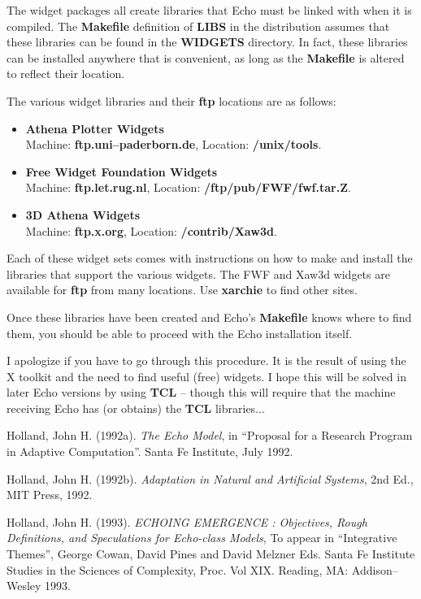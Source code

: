 The widget packages all create libraries that Echo must be linked with
when it is compiled. The {\bf Makefile} definition of {\bf LIBS} in
the distribution assumes that these libraries can be found in the {\bf
WIDGETS} directory. In fact, these libraries can be installed anywhere
that is convenient, as long as the {\bf Makefile} is altered to
reflect their location.

The various widget libraries and their {\bf ftp} locations are as
follows:

\begin{itemize}

\item {\bf Athena Plotter Widgets} \\
Machine: {\bf ftp.uni--paderborn.de}, Location: {\bf /unix/tools}.

\item {\bf Free Widget Foundation Widgets} \\
Machine: {\bf ftp.let.rug.nl}, Location: {\bf /ftp/pub/FWF/fwf.tar.Z}.

\item {\bf 3D Athena Widgets} \\
Machine: {\bf ftp.x.org}, Location: {\bf /contrib/Xaw3d}.

\end{itemize}

Each of these widget sets comes with instructions on how to make and
install the libraries that support the various widgets. The FWF and
Xaw3d widgets are available for {\bf ftp} from many locations. Use
{\bf xarchie} to find other sites.

Once these libraries have been created and Echo's {\bf Makefile} knows
where to find them, you should be able to proceed with the Echo
installation itself.

I apologize if you have to go through this procedure. It is the result
of using the X toolkit and the need to find useful (free) widgets. I
hope this will be solved in later Echo versions by using {\bf TCL} --
though this will require that the machine receiving Echo has (or
obtains) the {\bf TCL} libraries...

\newpage
\begin{thebibliography}{99}

Holland, John H. (1992a).
{\em The Echo Model},
in ``Proposal for a Research Program in Adaptive Computation''.
Santa Fe Institute, July 1992.

Holland, John H. (1992b).
{\em Adaptation in Natural and Artificial Systems}, 2nd Ed.,
MIT Press, 1992.

Holland, John H. (1993).
{\em ECHOING EMERGENCE : Objectives, Rough Definitions, and
Speculations for Echo-class Models},
To appear in ``Integrative Themes'', George Cowan, David Pines and
David Melzner Eds. Santa Fe Institute Studies in the Sciences of
Complexity, Proc. Vol XIX. Reading, MA: Addison--Wesley 1993.

\end {thebibliography}




